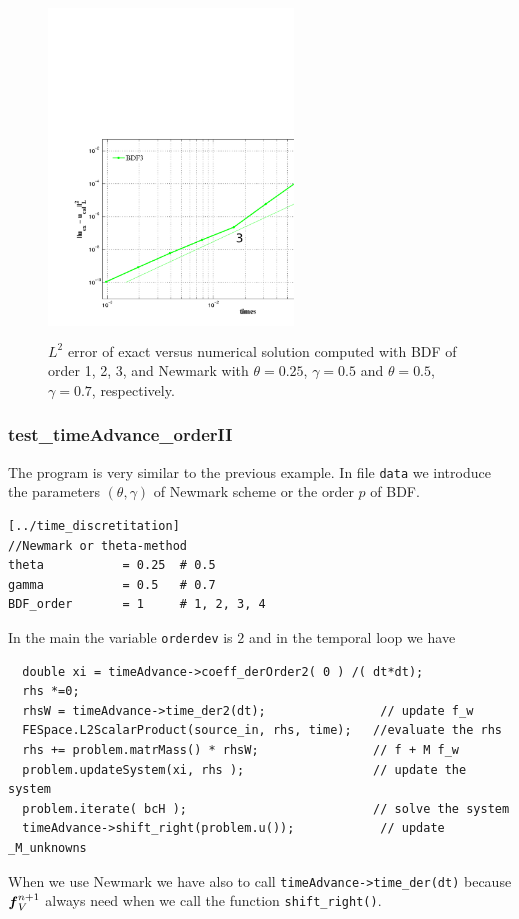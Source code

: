 \documentclass[english,a4paper]{article}
\newcommand{\fbf}{\text{\mbox{\boldmath $f$}}}
\begin{document}
\begin{figure}[!h]
\centering
\includegraphics[width=6.5cm, height=9cm]{figures/P21_order3.pdf}
\caption{$L^2$ error of exact versus numerical solution computed with
  BDF of order 1, 2, 3, and Newmark with
$\theta=0.25$, $\gamma=0.5$ and $\theta=0.5$, $\gamma=0.7$, respectively.  }\label{acc2}
\end{figure}
\clearpage
\newpage
\subsubsection{test\_timeAdvance\_orderII}
The program is very similar to the previous example.
In file \verb"data" we introduce the parameters $(\theta, \gamma)$ of
Newmark scheme or the order $p$ of BDF.
\begin{verbatim}
[../time_discretitation]
//Newmark or theta-method
theta           = 0.25  # 0.5  
gamma           = 0.5   # 0.7    
BDF_order       = 1     # 1, 2, 3, 4        
\end{verbatim}
In the main the variable \verb"orderdev" is $2$ and in the temporal
loop we have
\begin{verbatim}
  double xi = timeAdvance->coeff_derOrder2( 0 ) /( dt*dt);
  rhs *=0;
  rhsW = timeAdvance->time_der2(dt);                // update f_w
  FESpace.L2ScalarProduct(source_in, rhs, time);   //evaluate the rhs
  rhs += problem.matrMass() * rhsW;                // f + M f_w
  problem.updateSystem(xi, rhs );                  // update the system
  problem.iterate( bcH );                          // solve the system
  timeAdvance->shift_right(problem.u());            // update _M_unknowns
\end{verbatim}
 When we use Newmark we have also to call \verb"timeAdvance->time_der(dt)" because $\fbf_V^{n+1}$ always need when we call
 the function \verb"shift_right()".
\end{document}
